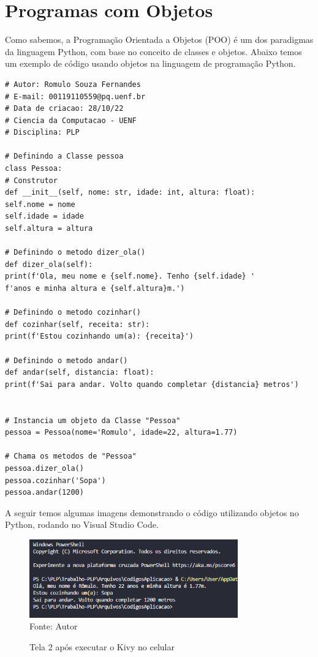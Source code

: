     \section{Programas com Objetos}
    Como sabemos, a Programação Orientada a Objetos (POO) é um dos paradigmas da linguagem
    Python, com base no conceito de classes e objetos. Abaixo temos um exemplo de código usando objetos na linguagem de programação Python.
\begin{lstlisting}
# Autor: Romulo Souza Fernandes
# E-mail: 00119110559@pq.uenf.br
# Data de criacao: 28/10/22
# Ciencia da Computacao - UENF
# Disciplina: PLP

# Definindo a Classe pessoa
class Pessoa:
# Construtor
def __init__(self, nome: str, idade: int, altura: float):
self.nome = nome
self.idade = idade
self.altura = altura

# Definindo o metodo dizer_ola()
def dizer_ola(self):
print(f'Ola, meu nome e {self.nome}. Tenho {self.idade} '
f'anos e minha altura e {self.altura}m.')

# Definindo o metodo cozinhar()
def cozinhar(self, receita: str):
print(f'Estou cozinhando um(a): {receita}')

# Definindo o metodo andar()
def andar(self, distancia: float):
print(f'Sai para andar. Volto quando completar {distancia} metros')


# Instancia um objeto da Classe "Pessoa"
pessoa = Pessoa(nome='Romulo', idade=22, altura=1.77)

# Chama os metodos de "Pessoa"
pessoa.dizer_ola()
pessoa.cozinhar('Sopa')
pessoa.andar(1200)
\end{lstlisting}
	A seguir temos algumas imagens demonstrando o código utilizando objetos no Python, rodando no Visual Studio Code.
    \begin{figure}[H]
    	\begin{center}
    		\caption{Tela 2 após executar o Kivy no celular} \label{ling1}
    		\includegraphics[width=9cm]{objetos.png} \\
    		{\tiny \sf Fonte:{ Autor}}
    	\end{center}
    \end{figure}
    
